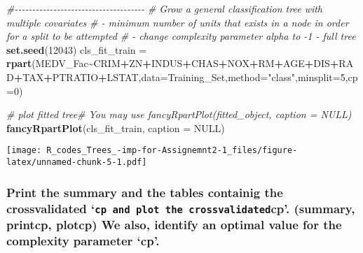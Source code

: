 \documentclass[
]{article}
\newenvironment{Shaded}{\begin{snugshade}}{\end{snugshade}}
\newcommand{\AttributeTok}[1]{\textcolor[rgb]{0.13,0.29,0.53}{#1}}
\newcommand{\CommentTok}[1]{\textcolor[rgb]{0.56,0.35,0.01}{\textit{#1}}}
\newcommand{\ConstantTok}[1]{\textcolor[rgb]{0.56,0.35,0.01}{#1}}
\newcommand{\DecValTok}[1]{\textcolor[rgb]{0.00,0.00,0.81}{#1}}
\newcommand{\FunctionTok}[1]{\textcolor[rgb]{0.13,0.29,0.53}{\textbf{#1}}}
\newcommand{\NormalTok}[1]{#1}
\newcommand{\OtherTok}[1]{\textcolor[rgb]{0.56,0.35,0.01}{#1}}
\newcommand{\SpecialCharTok}[1]{\textcolor[rgb]{0.81,0.36,0.00}{\textbf{#1}}}
\newcommand{\StringTok}[1]{\textcolor[rgb]{0.31,0.60,0.02}{#1}}
\begin{document}
\begin{Shaded}
\begin{Highlighting}[]
\CommentTok{\#{-}{-}{-}{-}{-}{-}{-}{-}{-}{-}{-}{-}{-}{-}{-}{-}{-}{-}{-}{-}{-}{-}{-}{-}{-}{-}{-}{-}{-}{-}{-}{-}{-}{-}{-}{-}{-}}
\CommentTok{\# Grow a general classification tree with multiple covariates}
\CommentTok{\# {-} minimum number of units that exists in a node in order for a split to be attempted}
\CommentTok{\# {-} change complexity parameter alpha to {-}1 {-} full tree}
\FunctionTok{set.seed}\NormalTok{(}\DecValTok{12043}\NormalTok{)}
\NormalTok{cls\_fit\_train }\OtherTok{=} \FunctionTok{rpart}\NormalTok{(MEDV\_Fac}\SpecialCharTok{\textasciitilde{}}\NormalTok{CRIM}\SpecialCharTok{+}\NormalTok{ZN}\SpecialCharTok{+}\NormalTok{INDUS}\SpecialCharTok{+}\NormalTok{CHAS}\SpecialCharTok{+}\NormalTok{NOX}\SpecialCharTok{+}\NormalTok{RM}\SpecialCharTok{+}\NormalTok{AGE}\SpecialCharTok{+}\NormalTok{DIS}\SpecialCharTok{+}\NormalTok{RAD}\SpecialCharTok{+}\NormalTok{TAX}\SpecialCharTok{+}\NormalTok{PTRATIO}\SpecialCharTok{+}\NormalTok{LSTAT,}\AttributeTok{data=}\NormalTok{Training\_Set,}\AttributeTok{method=}\StringTok{"class"}\NormalTok{,}\AttributeTok{minsplit=}\DecValTok{5}\NormalTok{,}\AttributeTok{cp=}\DecValTok{0}\NormalTok{)}

\CommentTok{\# plot fitted tree\# You may use fancyRpartPlot(fitted\_object, caption = NULL)}
\FunctionTok{fancyRpartPlot}\NormalTok{(cls\_fit\_train, }\AttributeTok{caption =} \ConstantTok{NULL}\NormalTok{)}
\end{Highlighting}
\end{Shaded}

\texttt{[image: R\_codes\_Trees\_-imp-for-Assignemnt2-1\_files/figure-latex/unnamed-chunk-5-1.pdf]}

\hypertarget{print-the-summary-and-the-tables-containig-the-crossvalidated-cp-and-plot-the-crossvalidatedcp.-summary-printcp-plotcp-we-also-identify-an-optimal-value-for-the-complexity-parameter-cp.}{%
\subsubsection{\texorpdfstring{Print the summary and the tables
containig the crossvalidated
`\texttt{cp\textquotesingle{}\ and\ plot\ the\ \textasciigrave{}crossvalidated}cp'.
(summary, printcp, plotcp) We also, identify an optimal value for the
complexity parameter
`cp'.}{Print the summary and the tables containig the crossvalidated `cp\textquotesingle{} and plot the `crossvalidatedcp'. (summary, printcp, plotcp) We also, identify an optimal value for the complexity parameter `cp'.}}\label{print-the-summary-and-the-tables-containig-the-crossvalidated-cp-and-plot-the-crossvalidatedcp.-summary-printcp-plotcp-we-also-identify-an-optimal-value-for-the-complexity-parameter-cp.}}
\end{document}
